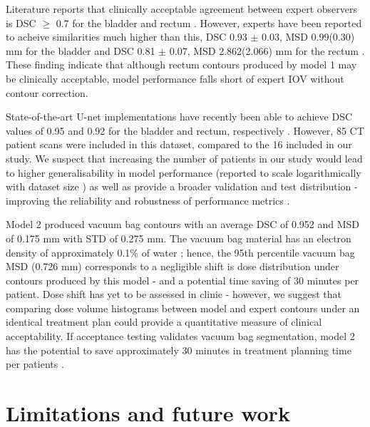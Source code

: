 Literature reports that clinically acceptable agreement between expert observers is DSC $\geq$ 0.7 for the bladder and rectum \cite{Roach_2019}. However, experts have been reported to acheive similarities much higher than this,  DSC 0.93 $\pm$ 0.03, MSD 0.99(0.30) mm for the bladder and DSC 0.81 $\pm$ 0.07, MSD 2.862(2.066) mm for the rectum \cite{Roach_2019}. These finding indicate that although rectum contours produced by model 1 may be clinically acceptable, model performance falls short of expert IOV without contour correction. 

State-of-the-art U-net implementations have recently been able to achieve DSC values of 0.95 and 0.92 for the bladder and rectum, respectively \cite{Kazemifar_2018}. However, 85 CT patient scans were included in this dataset, compared to the 16 included in our study. We suspect that increasing the number of patients in our study would lead to higher generalisability in model performance (reported to scale logarithmically with dataset size \cite{Nemoto_2020}) as well as provide a broader validation and test distribution - improving the reliability and robustness of performance metrics \cite{Ronneberger_2015}. 

Model 2 produced vacuum bag contours with an average DSC of 0.952 and MSD of 0.175 mm with STD of 0.275 mm. The vacuum bag material has an electron density of approximately 0.1\% of water \cite{CITATION}; hence, the 95th percentile vacuum bag MSD (0.726 mm) corresponds to a negligible shift is dose distribution under contours produced by this model - and a potential time saving of 30 minutes per patient. Dose shift has yet to be assessed  in clinic - however, we suggest that comparing dose volume histograms between model and expert contours under an identical treatment plan could provide a quantitative measure of clinical acceptability. If acceptance testing validates vacuum bag segmentation, model 2 has the potential to save approximately 30 minutes in treatment planning time per patients \cite{CITATION}.





\section{Limitations and future work}

